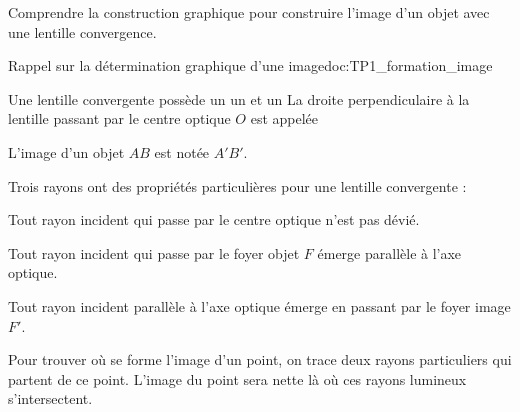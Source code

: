 \teteSndLumi

\vspace*{-30pt}


\begin{objectifs}
  \item Comprendre la construction graphique pour construire l'image d'un objet avec une lentille convergence.
\end{objectifs}


\begin{doc}{Rappel sur la détermination graphique d'une image}{doc:TP1_formation_image}
  \begin{importants}
    Une lentille convergente possède un  un et un 
    La droite perpendiculaire à la lentille passant par le centre optique $O$ est appelée 
  \end{importants}
  L'image d'un objet $AB$ est notée $A'B'$.
  
  \begin{center}
  \end{center}
  
  \begin{importants}
    Trois rayons ont des propriétés particulières pour une lentille convergente :
  \begin{listePoints}
    \item Tout rayon incident qui passe par le centre optique n'est pas dévié.
    \item Tout rayon incident qui passe par le foyer objet $F$ émerge parallèle à l'axe optique.
    \item Tout rayon incident parallèle à l'axe optique émerge en passant par le foyer image $F'$.
  \end{listePoints}
  \end{importants}
  Pour trouver où se forme l'image d'un point, on trace deux rayons particuliers qui partent de ce point. 
  L'image du point sera nette là où ces rayons lumineux s'intersectent.
\end{doc}


